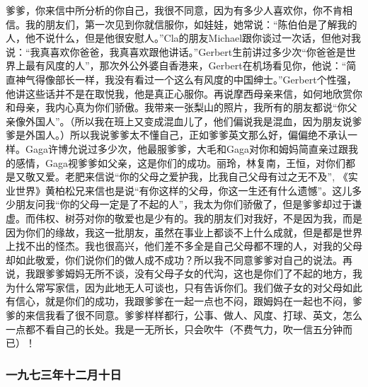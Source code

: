 \par {}
\par 爹爹，你来信中所分析的你自己，我很不同意，因为有多少人喜欢你，你不肯相信。我的朋友们，第一次见到你就信服你，如娃娃，她常说：“陈伯伯是了解我的人，他不说什么，但是他很安慰人。”Cla的朋友Michael跟你谈过一次话，但他对我说：“我真喜欢你爸爸，我真喜欢跟他讲话。”Gerbert生前讲过多少次“你爸爸是世界上最有风度的人”，那次外公外婆自香港来，Gerbert在机场看见你，他说：“简直神气得像部长一样，我没有看过一个这么有风度的中国绅士。”Gerbert个性强，他讲这些话并不是在取悦我，他是真正心服你。再说摩西母亲来信，如何地欣赏你和母亲，我内心真为你们骄傲。我带来一张梨山的照片，我所有的朋友都说“你父亲像外国人”。（所以我在班上又变成混血儿了，他们偏说我是混血，因为朋友说爹爹是外国人。）所以我说爹爹太不懂自己，正如爹爹英文那么好，偏偏绝不承认一样。Gaga许博允说过多少次，他最服爹爹，大毛和Gaga对你和姆妈简直亲过跟我的感情，Gaga视爹爹如父亲，这是你们的成功。丽玲，林复南，王恒，对你们都是又敬又爱。老肥来信说“你的父母之爱护我，比我自己父母有过之无不及”, 《实业世界》黄柏松兄来信也是说“有你这样的父母，你这一生还有什么遗憾”。这儿多少朋友问我“你的父母一定是了不起的人”，我太为你们骄傲了，但是爹爹却过于谦虚。而伟权、树芬对你的敬爱也是少有的。我的朋友们对我好，不是因为我，而是因为你们的缘故，我这一批朋友，虽然在事业上都谈不上什么成就，但是都是世界上找不出的怪杰。我也很高兴，他们差不多全是自己父母都不理的人，对我的父母却如此敬爱，你们说你们的做人成不成功？所以我不同意爹爹对自己的说法。再说，我跟爹爹姆妈无所不谈，没有父母子女的代沟，这也是你们了不起的地方，我为什么常写家信，因为此地无人可谈也，只有告诉你们。我们做子女的对父母如此有信心，就是你们的成功，我跟爹爹在一起一点也不闷，跟姆妈在一起也不闷，爹爹的来信我看了很不同意。爹爹样样都行，公事、做人、风度、打球、英文，怎么一点都不看自己的长处。我是一无所长，只会吹牛（不费气力，吹一信五分钟而已）！
\par {}

\subsubsection{一九七三年十二月十日}


